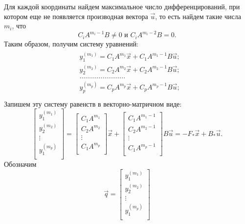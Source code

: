 Для каждой координаты найдем максимальное число дифференцирований, при котором еще не появляется производная вектора $\vec{u}$, то есть найдем такие числа $m_i$, что
\begin{equation*}
	C_iA^{m_i-1}B\neq0 \text{ и } C_iA^{m_i-2}B=0.
\end{equation*}
Таким образом, получим систему уравнений:
\begin{gather}
\begin{split}
	&y_1^{(m_1)}=C_1A^{m_1}\vec{x}+C_1A^{m_1-1}B\vec{u};\\
	&y_2^{(m_2)}=C_2A^{m_2}\vec{x}+C_2A^{m_2-1}B\vec{u};\\
	&\dots\dots\dots\dots\dots\dots\dots\dots\\
	&y_p^{(m_p)}=C_pA^{m_p}\vec{x}+C_pA^{m_p-1}B\vec{u};\\
\end{split}
\end{gather}
Запишем эту систему равенств в  векторно-матричном  виде:
\begin{equation}
	\begin{bmatrix}
	    y_1^{(m_1)}\\
	    y_2^{(m_2)}\\
	    \vdots \\
	    y_1^{(m_p)}\\
	\end{bmatrix}=
	\begin{bmatrix}
	    C_1A^{m_1}\\
	    C_2A^{m_2}\\
	    \vdots \\
	    C_1A^{m_p}\\
	\end{bmatrix}\vec{x}+
	\begin{bmatrix}
	    C_1A^{m_1-1}\\
	    C_2A^{m_2-1}\\
	    \vdots \\
	    C_1A^{m_p-1}\\
	\end{bmatrix}B\vec{u}=-F_*\vec{x}+B_*\vec{u}.
\end{equation}
Обозначим
\begin{equation}
	\vec{q}=
	\begin{bmatrix}
	    y_1^{(m_1)}\\
	    y_2^{(m_2)}\\
	    \vdots \\
	    y_1^{(m_p)}\\
	\end{bmatrix}
\end{equation}
